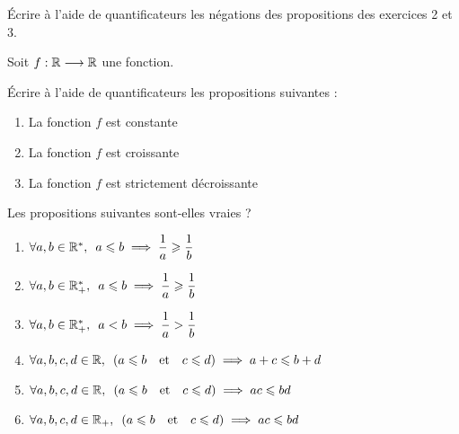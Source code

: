 \begin{exo}[Exercice 4]
Écrire à l'aide de quantificateurs les négations des propositions des exercices 2 et 3.
\end{exo}

\begin{corr}
\end{corr}

\begin{exo}[Exercice 5]
Soit \(f:\mathbb{R}\longrightarrow\mathbb{R}\) une fonction.

Écrire à l'aide de quantificateurs les propositions suivantes :

\begin{enumerate}
\item La fonction \(f\) est constante \\

\item La fonction \(f\) est croissante \\

\item La fonction \(f\) est strictement décroissante
\end{enumerate}
\end{exo}

\begin{corr}
\end{corr}

\begin{exo}[Exercice 6]
Les propositions suivantes sont-elles vraies ?

\begin{enumerate}
\item \(\quantifs{\forall a,b\in\Rs}a\leq b\imp\dfrac{1}{a}\geq\dfrac{1}{b}\) \\

\item \(\quantifs{\forall a,b\in\Rps}a\leq b\imp\dfrac{1}{a}\geq\dfrac{1}{b}\) \\

\item \(\quantifs{\forall a,b\in\Rps}a<b\imp\dfrac{1}{a}>\dfrac{1}{b}\) \\

\item \(\quantifs{\forall a,b,c,d\in\R}\paren{a\leq b\quad\text{et}\quad c\leq d}\imp a+c\leq b+d\) \\

\item \(\quantifs{\forall a,b,c,d\in\R}\paren{a\leq b\quad\text{et}\quad c\leq d}\imp ac\leq bd\) \\

\item \(\quantifs{\forall a,b,c,d\in\Rp}\paren{a\leq b\quad\text{et}\quad c\leq d}\imp ac\leq bd\)
\end{enumerate}
\end{exo}

